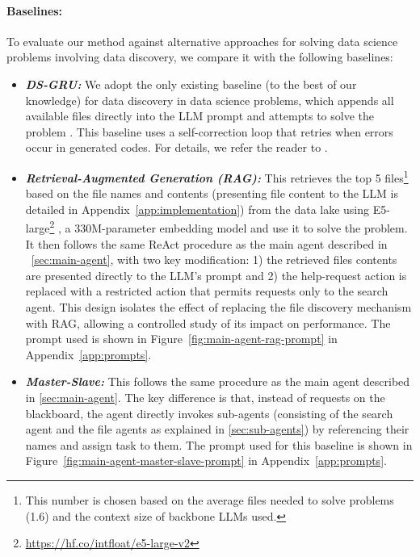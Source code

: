 \paragraph{Baselines:} To evaluate our method against alternative approaches for solving data science problems involving data discovery, we compare it with the following baselines:
\begin{itemize}[leftmargin=*]
    \item \textit{\textbf{DS-GRU:}} We adopt the only existing baseline (to the best of our knowledge) for data discovery in data science problems, which appends all available files directly into the LLM prompt and attempts to solve the problem \citep{lai2025kramabenchbenchmarkaisystems}. This baseline uses a self-correction loop that retries when errors occur in generated codes. For details, we refer the reader to \citet{lai2025kramabenchbenchmarkaisystems}.
    
    \item \textit{\textbf{Retrieval-Augmented Generation (RAG):}} This retrieves the top 5 files\footnote{This number is chosen based on the average files needed to solve problems (1.6) and the context size of backbone LLMs used.} based on the file names and contents (presenting file content to the LLM is detailed in Appendix~\ref{app:implementation}) from the data lake using E5-large\footnote{\url{https://hf.co/intfloat/e5-large-v2}} \citep{wang2022text}, a 330M-parameter embedding model and use it to solve the problem. It then follows the same ReAct procedure as the main agent described in \textsection~\ref{sec:main-agent}, with two key modification: 1) the retrieved files contents are presented directly to the LLM's prompt and 2) the help-request action is replaced with a restricted action that permits requests only to the search agent. This design isolates the effect of replacing the file discovery mechanism with RAG, allowing a controlled study of its impact on performance. The prompt used is shown in Figure~\ref{fig:main-agent-rag-prompt} in Appendix~\ref{app:prompts}.
    
    \item \textit{\textbf{Master-Slave:}} This follows the same procedure as the main agent described in \textsection\ref{sec:main-agent}. The key difference is that, instead of requests on the blackboard, the agent directly invokes sub-agents (consisting of the search agent and the file agents as explained in \textsection\ref{sec:sub-agents}) by referencing their names and assign task to them. The prompt used for this baseline is shown in Figure~\ref{fig:main-agent-master-slave-prompt} in Appendix~\ref{app:prompts}.
\end{itemize} 



